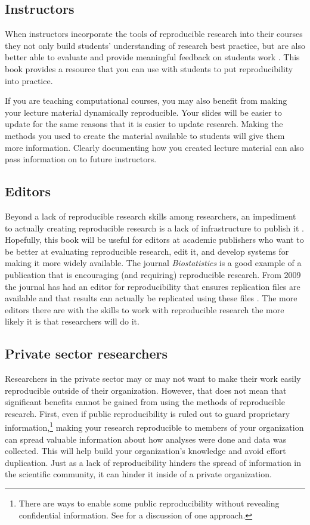 \subsection{Instructors}
When instructors incorporate the tools of reproducible research into their courses they not only build students' understanding of research best practice, but are also better able to evaluate and provide meaningful feedback on students work \cite[183]{Ball2012}. This book provides a resource that you can use with students to put reproducibility into practice.

If you are teaching computational courses, you may also benefit from making your lecture material dynamically reproducible. Your slides will be easier to update for the same reasons that it is easier to update research.  Making the methods you used to create the material available to students will give them more information. Clearly documenting how you created lecture material can also pass information on to future instructors. 

\subsection{Editors}
Beyond a lack of reproducible research skills among researchers, an impediment to actually creating reproducible research is a lack of infrastructure to publish it \cite[]{Peng2011}. Hopefully, this book will be useful for editors at academic publishers who want to be better at evaluating reproducible research, edit it, and develop systems for making it more widely available. The journal {\emph{Biostatistics}} is a good example of a publication that is encouraging (and requiring) reproducible research. From 2009 the journal  has had an editor for reproducibility that ensures replication files are available and that results can actually be replicated using these files \cite[]{Peng2009}. The more editors there are with the skills to work with reproducible research the more likely it is that researchers will do it.

\subsection{Private sector researchers}

Researchers in the private sector may or may not want to make their work easily reproducible outside of their organization. However, that does not mean that significant benefits cannot be gained from using the methods of reproducible research. First, even if public reproducibility is ruled out to guard proprietary information,\footnote{There are ways to enable some public reproducibility without revealing confidential information. See \cite{Vandewalle2007} for a discussion of one approach.} making your research reproducible to members of your organization can spread valuable information about how analyses were done and data was collected. This will help build your organization's knowledge and avoid effort duplication. Just as a lack of reproducibility hinders the spread of information in the scientific community, it can hinder it inside of a private organization. 

